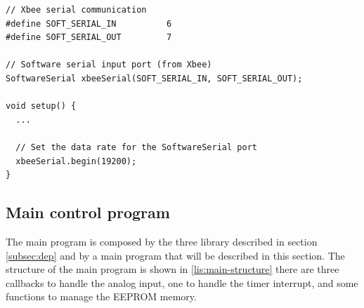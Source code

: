 \documentclass[11pt,english]{article}
\begin{document}
%
\begin{lstlisting}[label=lis:softserial-config,caption=SoftwareSerial configuration]
// Xbee serial communication
#define SOFT_SERIAL_IN          6
#define SOFT_SERIAL_OUT         7

// Software serial input port (from Xbee)
SoftwareSerial xbeeSerial(SOFT_SERIAL_IN, SOFT_SERIAL_OUT);

void setup() {
  ...
  
  // Set the data rate for the SoftwareSerial port
  xbeeSerial.begin(19200);
}

\end{lstlisting}



\subsection{Main control program}

The main program is composed by the three library described in section \ref{subsec:dep} and by a main 
program that will be described in this section. The structure of the main program is shown in \ref{lis:main-structure} 
there are three callbacks to handle the analog input, one to handle the timer interrupt, and some 
functions to manage the EEPROM memory.
\end{document}
